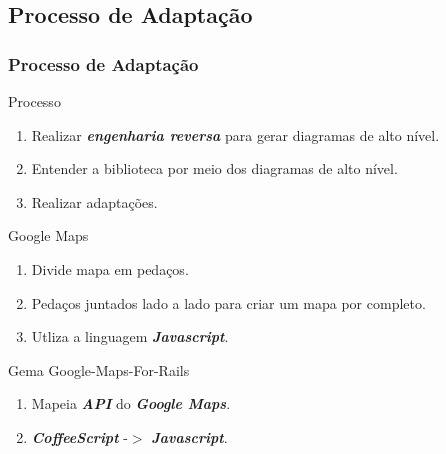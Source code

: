\subsection{Processo de Adaptação}
\begin{frame}
 \frametitle{Processo de Adaptação}

  \begin{block}{Processo}

    \begin{enumerate}

     \item Realizar \emph{\textbf{engenharia reversa}} para gerar diagramas de alto nível.

     \item Entender a biblioteca por meio dos diagramas de alto nível.

     \item Realizar adaptações.

    \end{enumerate}

  \end{block}

  \begin{block}{Google Maps}

    \begin{enumerate}

     \item Divide mapa em pedaços.

     \item Pedaços juntados lado a lado para criar um mapa por completo.

     \item Utliza a linguagem \emph{\textbf{Javascript}}.

    \end{enumerate}

  \end{block}  
  
  \begin{block}{Gema Google-Maps-For-Rails}

    \begin{enumerate}

     \item Mapeia \emph{\textbf{API}} do \emph{\textbf{Google Maps}}.

     \item \emph{\textbf{CoffeeScript}} -$>$ \emph{\textbf{Javascript}}.     

    \end{enumerate}

  \end{block}    
  
\end{frame}


